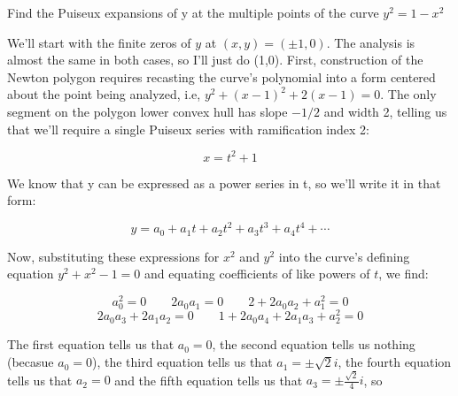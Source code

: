%
%
%
%
%
%
%

\example Find the Puiseux expansions of y at the multiple points of the
curve $y^2 = 1 - x^2$

We'll start with the finite zeros of $y$ at $(x,y)=(\pm 1, 0)$.  The
analysis is almost the same in both cases, so I'll just do (1,0).
First, construction of the Newton polygon requires recasting the
curve's polynomial into a form centered about the point being
analyzed, i.e, $y^2 + (x-1)^2 + 2(x-1) = 0$.  The only segment on the
polygon lower convex hull has slope $-1/2$ and width 2, telling us
that we'll require a single Puiseux series with ramification index 2:

$$x=t^2+1$$

We know that y can be expressed as a power series in t, so we'll write
it in that form:

$$y=a_0 + a_1 t + a_2 t^2 + a_3 t^3 + a_4 t^4 + \cdots$$

Now, substituting these expressions for $x^2$ and $y^2$ into the
curve's defining equation $y^2 + x^2 - 1 = 0$ and equating coefficients
of like powers of $t$, we find:

$$a_0^2=0 \qquad 2 a_0 a_1 = 0 \qquad 2 + 2 a_0 a_2 + a_1^2 = 0$$
$$2 a_0 a_3 + 2 a_1 a_2 = 0 \qquad 1 + 2 a_0 a_4 + 2 a_1 a_3 + a_2^2 = 0$$

The first equation tells us that $a_0 = 0$, the second equation tells
us nothing (becasue $a_0=0$), the third equation tells us that $a_1
= \pm\sqrt{2}i$, the fourth equation tells us that $a_2=0$ and the
fifth equation tells us that $a_3 = \pm \frac{\sqrt{2}}{4} i$, so

